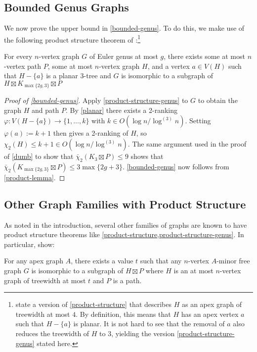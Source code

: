 \documentclass[kpfonts]{patmorin}
\newcommand{\trn}{\chi_2}
\newcommand{\dtcn}{\bar{\chi}_2}
\theoremstyle{named}
\begin{document}
\subsection{Bounded Genus Graphs}

We now prove the upper bound in \cref{bounded-genus}. To do this, we make use of the following product structure theorem of \citet{dujmovic.joret.ea:planar}:\footnote{\citet{dujmovic.joret.ea:planar} state a version of \cref{product-structure} that describes $H$ as an apex graph of treewidth at most $4$.  By definition, this means that $H$ has an apex vertex $a$ such that $H-\{a\}$ is planar.  It is not hard to see that the removal of $a$ also reduces the treewidth of $H$ to 3, yielding the version \cref{product-structure-genus} stated here.}

\begin{thm} \label{product-structure-genus}
    For every $n$-vertex graph $G$ of Euler genus at most $g$, there exists some at most $n$-vertex path $P$, some at most $n$-vertex graph $H$, and a vertex $a\in V(H)$ such that $H-\{a\}$ is a planar 3-tree and $G$ is isomorphic to a subgraph of $H\boxtimes K_{\max\{2g,3\}}\boxtimes P$
\end{thm}

\begin{proof}[Proof of \cref{bounded-genus}]
    Apply \cref{product-structure-genus} to $G$ to obtain the graph $H$ and path $P$.  By \cref{planar} there exists a 2-ranking $\varphi:V(H-\{a\})\to \{1,\ldots,k\}$ with $k\in O(\log n/\log^{(3)} n)$. Setting $\varphi(a):=k+1$ then gives a 2-ranking of $H$, so $\trn(H)\le k+1\in O(\log n/\log^{(3)} n)$.  The same argument used in the proof of \cref{dumb} to show that $\dtcn(K_3\boxtimes P)\le 9$ shows that $\dtcn(K_{\max\{2g,3\}}\boxtimes P)\le 3\max\{2g+3\}$.  \cref{bounded-genus} now follows from \cref{product-lemma}.
\end{proof}

\subsection{Other Graph Families with Product Structure}

As noted in the introduction, several other families of graphs are known to have product structure theorems like \cref{product-structure,product-structure-genus}.  In particular, \citet{dujmovic.joret.ea:planar} show:

\begin{thm}\label{apex-minor-free}
    For any apex graph $A$, there exists a value $t$ such that any $n$-vertex $A$-minor free graph $G$ is isomorphic to a subgraph of $H\boxtimes P$ where $H$ is an at most $n$-vertex graph of treewidth at most $t$ and $P$ is a path.
\end{thm}
\end{document}
